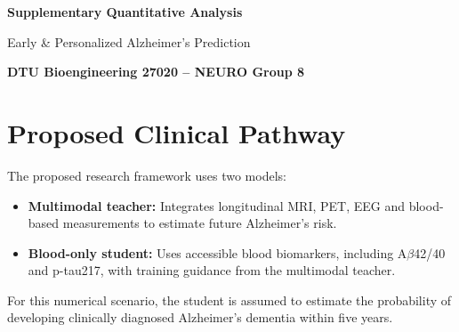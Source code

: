\documentclass[11pt,a4paper]{article}
\begin{document}

{\LARGE\bfseries\color{DTUblue}
Supplementary Quantitative Analysis\par}

\vspace{2mm}

{\large
Early \& Personalized Alzheimer's Prediction\par}

\vspace{2mm}

\textbf{DTU Bioengineering 27020 -- NEURO Group 8}

\vspace{4mm}

\noindent{}

\section{Proposed Clinical Pathway}

The proposed research framework uses two models:

\begin{itemize}
    \item \textbf{Multimodal teacher:}
    Integrates longitudinal MRI, PET, EEG and blood-based
    measurements to estimate future Alzheimer's risk.

    \item \textbf{Blood-only student:}
    Uses accessible blood biomarkers, including
    A$\beta$42/40 and p-tau217, with training guidance
    from the multimodal teacher.
\end{itemize}

For this numerical scenario, the student is assumed
to estimate the probability of developing clinically
diagnosed Alzheimer's dementia within five years.
\end{document}

